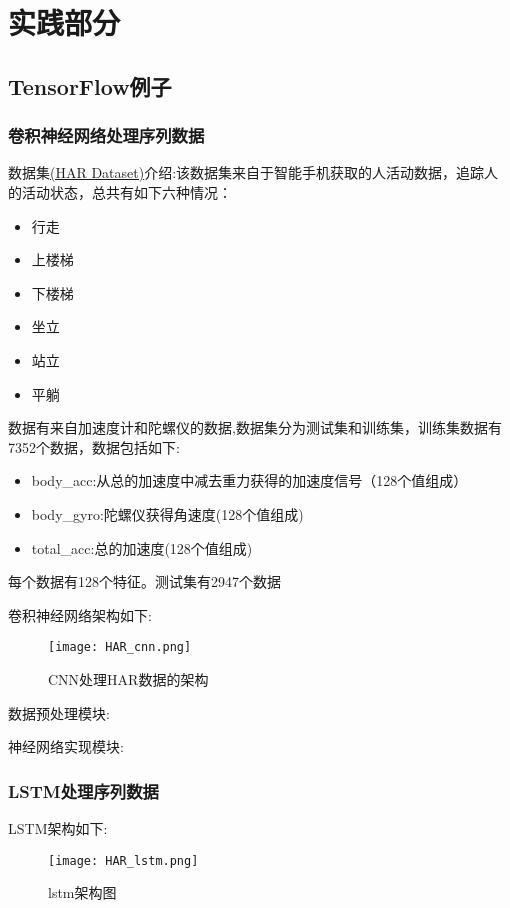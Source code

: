 \chapter{实践部分}
\section{TensorFlow例子}
\subsection{卷积神经网络处理序列数据}
数据集\href{https://archive.ics.uci.edu/ml/machine-learning-databases/00240/UCI%20HAR%20Dataset.names}{(HAR Dataset)}介绍:该数据集来自于智能手机获取的人活动数据，追踪人的活动状态，总共有如下六种情况：
\begin{itemize}
\item 行走
\item 上楼梯
\item 下楼梯
\item 坐立
\item 站立
\item 平躺
\end{itemize}
数据有来自加速度计和陀螺仪的数据,数据集分为测试集和训练集，训练集数据有7352个数据，数据包括如下:
\begin{itemize}
	\item body\_acc:从总的加速度中减去重力获得的加速度信号（128个值组成）
	\item body\_gyro:陀螺仪获得角速度(128个值组成)
	\item total\_acc:总的加速度(128个值组成)
\end{itemize}每个数据有128个特征。测试集有2947个数据

卷积神经网络架构如下:
\begin{figure}[H]
\texttt{[image: HAR\_cnn.png]}
\caption{CNN处理HAR数据的架构}
\end{figure}
数据预处理模块:

神经网络实现模块:

\subsection{LSTM处理序列数据}
LSTM架构如下:
\begin{figure}[H]
	\texttt{[image: HAR\_lstm.png]}
	\caption{lstm架构图}
\end{figure}



